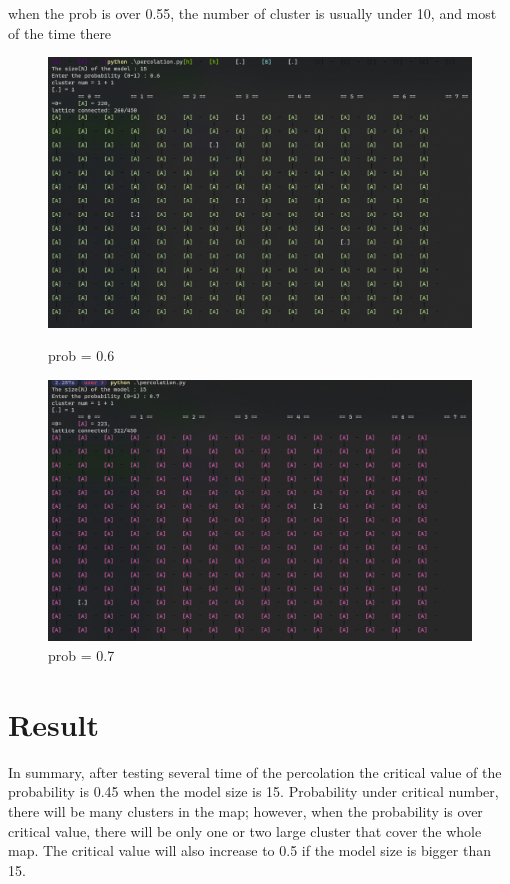 \documentclass{article}
\begin{document}
when the prob is over 0.55, the number of cluster is usually under 10, and most of the time there 

\begin{figure}[h]
   \begin{minipage}{0.48\textwidth}
     \centering
     \includegraphics[width=1\linewidth]{percolation result with size = 15/size_15_prob_0.6.png}
     \caption{prob = 0.6}\label{prob = 0.6}
   \end{minipage}\hfill
   \begin{minipage}{0.48\textwidth}
     \centering
     \includegraphics[width=1\linewidth]{percolation result with size = 15/size_15_prob_0.7.png}
     \caption{prob = 0.7}\label{prob = 0.7}
   \end{minipage}
\end{figure}

\section{Result}

In summary, after testing several time of the percolation the critical value of the probability is 0.45 when the model size is 15. Probability under critical number, there will be many clusters in the map; however, when the probability is over critical value, there will be only one or two large cluster that cover the whole map. The critical value will also increase to 0.5 if the model size is bigger than 15.
\end{document}
